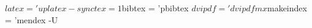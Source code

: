 $latex = 'uplatex -synctex=1 %
$bibtex = 'pbibtex %
$dvipdf = 'dvipdfmx %
$makeindex = 'mendex -U %
